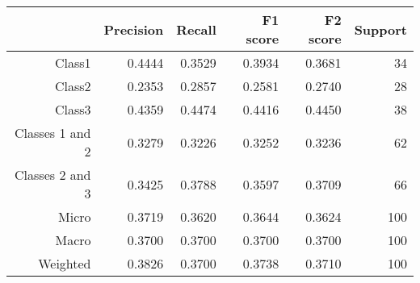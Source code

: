 \documentclass{standalone}
\begin{document}
{
    \Large
    \begin{tabular}{rrrrrr}
  \hline
   & \textbf{Precision} & \textbf{Recall} & \textbf{F1 score} & \textbf{F2 score} & \textbf{Support} \\\hline
  Class1 & 0.4444 & 0.3529 & 0.3934 & 0.3681 & 34 \\
  Class2 & 0.2353 & 0.2857 & 0.2581 & 0.2740 & 28 \\
  Class3 & 0.4359 & 0.4474 & 0.4416 & 0.4450 & 38 \\
  Classes 1 and 2 & 0.3279 & 0.3226 & 0.3252 & 0.3236 & 62 \\
  Classes 2 and 3 & 0.3425 & 0.3788 & 0.3597 & 0.3709 & 66 \\
  Micro & 0.3719 & 0.3620 & 0.3644 & 0.3624 & 100 \\
  Macro & 0.3700 & 0.3700 & 0.3700 & 0.3700 & 100 \\
  Weighted & 0.3826 & 0.3700 & 0.3738 & 0.3710 & 100 \\\hline
\end{tabular}

}
\end{document}
